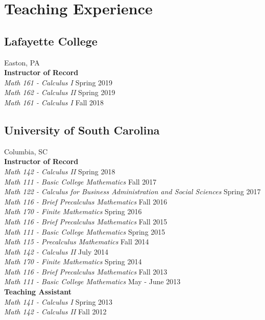 \documentclass{article}
\begin{document}
\section*{Teaching Experience}
\subsection*{Lafayette College}
\noindent Easton, PA\\

\noindent\textbf{Instructor of Record}\\
\textsl{Math 161 - Calculus I} \hfill Spring 2019\\
\textsl{Math 162 - Calculus II} \hfill Spring 2019\\
\textsl{Math 161 - Calculus I} \hfill Fall 2018

\subsection*{University of South Carolina}
\noindent Columbia, SC\\

\noindent\textbf{Instructor of Record}\\
\textsl{Math 142 - Calculus II} \hfill Spring 2018\\
\textsl{Math 111 - Basic College Mathematics} \hfill Fall 2017\\
\textsl{Math 122 - Calculus for Business Administration and Social Sciences} \hfill Spring 2017\\
\textsl{Math 116 - Brief Precalculus Mathematics} \hfill Fall 2016\\
\textsl{Math 170 - Finite Mathematics} \hfill Spring 2016\\
\textsl{Math 116 - Brief Precalculus Mathematics} \hfill Fall 2015\\
\textsl{Math 111 - Basic College Mathematics} \hfill Spring 2015\\
\textsl{Math 115 - Precalculus Mathematics} \hfill Fall 2014\\
\textsl{Math 142 - Calculus II} \hfill July 2014\\
\textsl{Math 170 - Finite Mathematics} \hfill Spring 2014\\
\textsl{Math 116 - Brief Precalculus Mathematics} \hfill Fall 2013\\
\textsl{Math 111 - Basic College Mathematics} \hfill May - June 2013\\

\noindent\textbf{Teaching Assistant}\\
\textsl{Math 141 - Calculus I} \hfill Spring 2013\\
\textsl{Math 142 - Calculus II} \hfill Fall 2012
\end{document}
